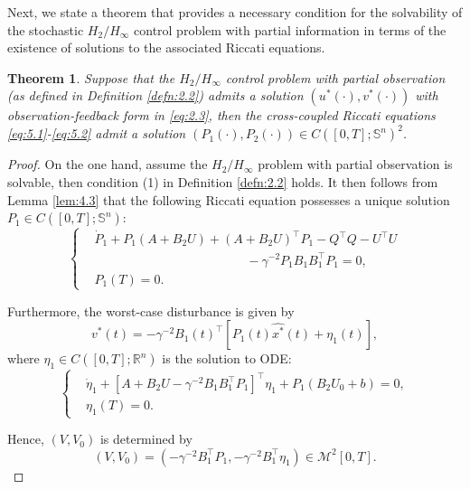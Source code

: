 \documentclass[lettersize,journal]{IEEEtran}
\theoremstyle{plain}
\newtheorem{thm}{Theorem}
\theoremstyle{definition}
\begin{document}
Next, we state a theorem that provides a necessary condition for the solvability of the stochastic $H_2/H_\infty$ control problem with partial information in terms of the existence of solutions to the associated Riccati equations.

\begin{thm}\label{thm:5.4}
	Suppose that the $H_2/H_\infty$ control problem with partial observation (as defined in Definition \ref{defn:2.2}) admits a solution $(u^*(\cdot),v^*(\cdot))$ with observation-feedback form in \eqref{eq:2.3}, then the cross-coupled Riccati equations \eqref{eq:5.1}-\eqref{eq:5.2} admit a solution $(P_1(\cdot),P_2(\cdot)) \in C([0,T];\mathbb{S}^n)^2$.
\end{thm}

\begin{proof}
	On the one hand, assume the $H_2/H_\infty$ problem with partial observation is solvable, then condition (1) in Definition \ref{defn:2.2} holds. It then follows from Lemma \ref{lem:4.3} that the following Riccati equation possesses a unique solution $P_1 \in C([0,T];\mathbb{S}^n)$:
	\begin{equation*}
		\left\{
		\begin{aligned}
			&\dot{P}_1 + P_1(A + B_2U) + (A + B_2U)^{\top}P_1 - Q^{\top}Q - U^{\top}U \\
			&\qquad\qquad\qquad\qquad\qquad\qquad - \gamma^{-2}P_1 B_1 B_1^{\top} P_1 = 0,\\
			&P_1(T) = 0.
		\end{aligned}
		\right.
	\end{equation*}
	
	Furthermore, the worst-case disturbance is given by 
	\begin{equation*}
		v^*(t) = -\gamma^{-2}B_1(t)^{\top}[P_1(t)\widehat{x^*}(t) + \eta_1(t)],
	\end{equation*}
	where $\eta_1 \in C([0,T];\mathbb{R}^n)$ is the solution to ODE:
	\begin{equation*}
		\left\{
		\begin{aligned}
			&\dot{\eta}_1 + [A + B_2U - \gamma^{-2}B_1B_1^{\top}P_1]^{\top}\eta_1 + P_1(B_2U_0 + b) = 0,\\
			&\eta_1(T) = 0.
		\end{aligned}
		\right.
	\end{equation*}
	
	Hence, $(V,V_0)$ is determined by
	\begin{equation*}
		(V,V_0) = (-\gamma^{-2}B_1^{\top}P_1,-\gamma^{-2}B_1^{\top}\eta_1) \in \mathcal{M}^2[0,T].
	\end{equation*}
	

\end{proof}
\end{document}
